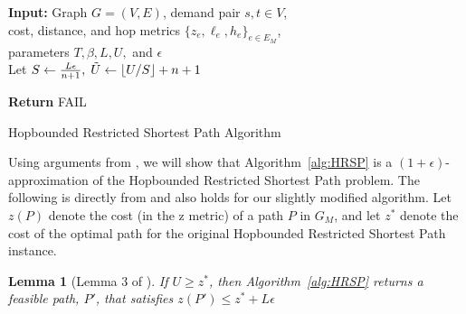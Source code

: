 \documentclass{article}
\newtheorem{lemma}[theorem]{Lemma}
\theoremstyle{definition}
\theoremstyle{remark}
\DeclarePairedDelimiter\floor{\lfloor}{\rfloor}
\begin{document}
\begin{algorithm}[ht]
\DontPrintSemicolon

\textbf{Input:} Graph $G = (V, E)$, demand pair $s,t \in V$, \\
cost, distance, and hop metrics $\{z_e, \ell_e, h_e \}_{e \in E_M}$, \\
parameters $T, \beta, L, U,$ and $\epsilon $ \;~\\

Let $S \gets \frac{L \epsilon}{n+1}, \; \Tilde{U} \gets \floor*{U/S} + n + 1$ \\ \; 

 \;

    
 \;

\textbf{Return} FAIL \;

\caption{\label{alg:HRSP} Hopbounded Restricted Shortest Path Algorithm } 
\end{algorithm}
Using arguments from \cite{LR01}, we will show that Algorithm~\ref{alg:HRSP} is a $(1+\epsilon)$-approximation of the Hopbounded Restricted Shortest Path problem.
\else
\fi
\iflong The following is directly from \cite{LR01} and also holds for our slightly modified algorithm. Let $z(P)$ denote the cost (in the $\bm{\mathrm{z}}$ metric) of a path $P$ in $G_M$, and let $z^*$ denote the cost of the optimal path for the original Hopbounded Restricted Shortest Path instance. 

\begin{lemma}[Lemma 3 of \cite{LR01}]
\label{lem:eps_approx}
    If $U \geq z^*$, then Algorithm~\ref{alg:HRSP} returns a feasible path, $P'$, that satisfies $z(P') \leq z^* + L\epsilon$
\end{lemma}
\end{document}
